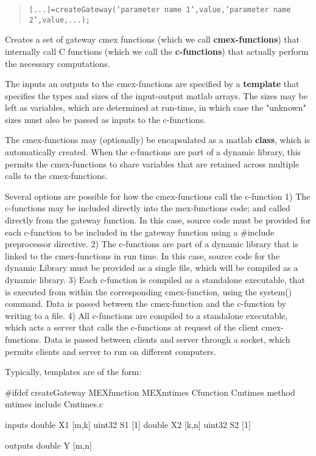 \begin{quote}
  \texttt{[...]=createGateway('parameter name 1',value,'parameter name 2',value,...);}
\end{quote}
Creates a set of gateway cmex functions (which we call \textbf{cmex-functions})
that internally call C functions (which we call the \textbf{c-functions}) that
actually perform the necessary computations.
 
The inputs an outputs to the cmex-functions are specified by a \textbf{template}
that specifies the types and sizes of the input-output matlab arrays.
The sizes may be left as variables, which are determined at run-time,
in which case the "unknown" sizes must also be passed as inputs to the
c-functions.
 
The cmex-functions may (optionally) be encapsulated as a matlab \textbf{class},
which is automatically created. When the c-functions are part of a dynamic library,
this permits the cmex-functions to share variables that are retained across
multiple calls to the cmex-functions.
 
Several options are possible for how the cmex-functions call the c-function
1) The c-functions may be included directly into the mex-functions code;
   and called directly from the gateway function.
   In this case, source code must be provided for each c-function to be
   included in the gateway function using a \#include preprocessor directive.
2) The c-functions are part of a dynamic library that is linked to the
   cmex-functions in run time.
   In this case, source code for the dynamic Library must be provided as a single
   file, which will be compiled as a dynamic library.
3) Each c-function is compiled as a standalone executable, that is executed from
   within the corresponding cmex-function, using the system() command.
   Data is passed between the cmex-function and the c-function by writing to a file.
4) All c-functions are compiled to a standalone executable, which acts a server
   that calls the c-functions at request of the client cmex-functions.
   Data is passed between clients and server through a socket, which permits
   clients and server to run on different computers.
 
Typically, templates are of the form:
 
\#ifdef createGateway
MEXfunction MEXmtimes
Cfunction   Cmtimes
method      mtimes
include     Cmtimes.c
 
inputs
	double X1 [m,k]
	uint32 S1 [1]
	double X2 [k,n]
	uint32 S2 [1]
 
outputs
	double Y [m,n]
 
